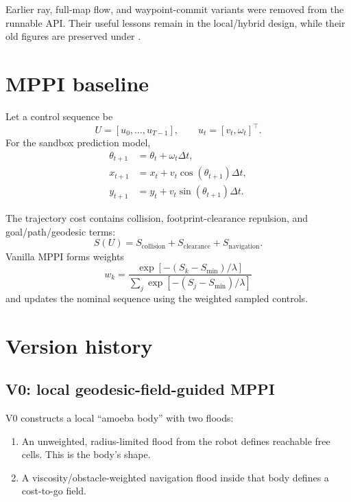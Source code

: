 \documentclass[11pt,a4paper]{article}
\newcommand{\code}[1]{\texttt{\detokenize{#1}}}
\begin{document}
Earlier ray, full-map flow, and waypoint-commit variants were removed from the
runnable API. Their useful lessons remain in the local/hybrid design, while
their old figures are preserved under \code{artifacts/images/legacy}.

\section{MPPI baseline}

Let a control sequence be
\begin{equation}
  U = [u_0,\ldots,u_{T-1}], \qquad u_t = [v_t,\omega_t]^\top.
\end{equation}
For the sandbox prediction model,
\begin{align}
  \theta_{t+1} &= \theta_t + \omega_t\Delta t,\\
  x_{t+1} &= x_t + v_t\cos(\theta_{t+1})\Delta t,\\
  y_{t+1} &= y_t + v_t\sin(\theta_{t+1})\Delta t.
\end{align}

The trajectory cost contains collision, footprint-clearance repulsion, and
goal/path/geodesic terms:
\begin{equation}
  S(U) = S_{\mathrm{collision}} + S_{\mathrm{clearance}}
       + S_{\mathrm{navigation}}.
\end{equation}
Vanilla MPPI forms weights
\begin{equation}
  w_k =
  \frac{\exp[-(S_k-S_{\min})/\lambda]}
       {\sum_j\exp[-(S_j-S_{\min})/\lambda]}
\end{equation}
and updates the nominal sequence using the weighted sampled controls.

\section{Version history}

\subsection{V0: local geodesic-field-guided MPPI}

V0 constructs a local ``amoeba body'' with two floods:

\begin{enumerate}[leftmargin=*]
  \item An unweighted, radius-limited flood from the robot defines reachable
  free cells. This is the body's shape.
  \item A viscosity/obstacle-weighted navigation flood inside that body defines
  a cost-to-go field.
\end{enumerate}
\end{document}
